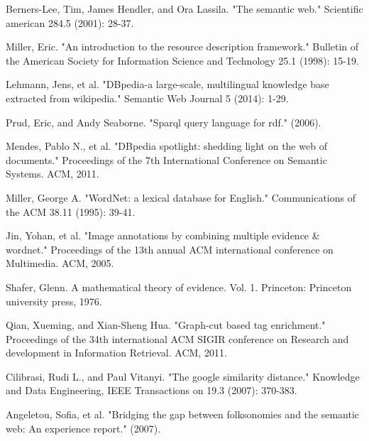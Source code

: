%
%
\begin{thebibliography}{11}
%
Berners-Lee, Tim, James Hendler, and Ora Lassila. "The semantic web." Scientific american 284.5 (2001): 28-37.

Miller, Eric. "An introduction to the resource description framework." Bulletin of the American Society for Information Science and Technology 25.1 (1998): 15-19.

Lehmann, Jens, et al. "DBpedia-a large-scale, multilingual knowledge base extracted from wikipedia." Semantic Web Journal 5 (2014): 1-29.

Prud, Eric, and Andy Seaborne. "Sparql query language for rdf." (2006).

Mendes, Pablo N., et al. "DBpedia spotlight: shedding light on the web of documents." Proceedings of the 7th International Conference on Semantic Systems. ACM, 2011.

Miller, George A. "WordNet: a lexical database for English." Communications of the ACM 38.11 (1995): 39-41.

Jin, Yohan, et al. "Image annotations by combining multiple evidence \& wordnet." Proceedings of the 13th annual ACM international conference on Multimedia. ACM, 2005.

Shafer, Glenn. A mathematical theory of evidence. Vol. 1. Princeton: Princeton university press, 1976.

Qian, Xueming, and Xian-Sheng Hua. "Graph-cut based tag enrichment." Proceedings of the 34th international ACM SIGIR conference on Research and development in Information Retrieval. ACM, 2011.

Cilibrasi, Rudi L., and Paul Vitanyi. "The google similarity distance." Knowledge and Data Engineering, IEEE Transactions on 19.3 (2007): 370-383.

Angeletou, Sofia, et al. "Bridging the gap between folksonomies and the semantic web: An experience report." (2007).
\end{thebibliography}